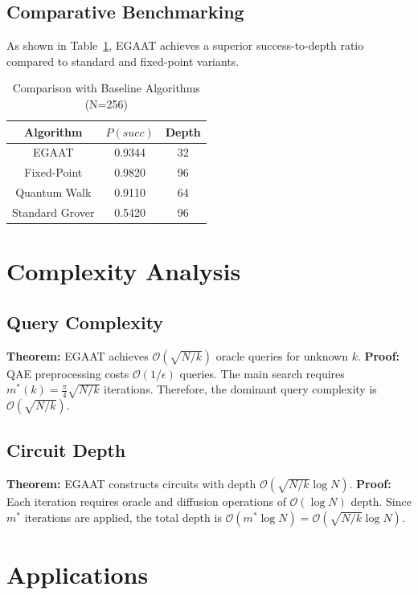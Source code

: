 \documentclass[journal]{IEEEtran}
\begin{document}
\subsection{Comparative Benchmarking}
As shown in Table~\ref{tab:comparison}, EGAAT achieves a superior success-to-depth ratio compared to standard and fixed-point variants.

\begin{table}[h]
\centering
\caption{Comparison with Baseline Algorithms (N=256)}
\label{tab:comparison}
\begin{tabular}{@{}ccc@{}}
\toprule
Algorithm       & $P(succ)$ & Depth \\ \midrule
EGAAT           & 0.9344    & 32    \\
Fixed-Point     & 0.9820    & 96    \\
Quantum Walk    & 0.9110    & 64    \\
Standard Grover & 0.5420    & 96    \\ \bottomrule
\end{tabular}
\end{table}

\section{Complexity Analysis}
\subsection{Query Complexity}
\textbf{Theorem:} EGAAT achieves $\mathcal{O}(\sqrt{N/k})$ oracle queries for unknown $k$.
\textbf{Proof:} QAE preprocessing costs $\mathcal{O}(1/\epsilon)$ queries. The main search requires $m^*(k) = \frac{\pi}{4}\sqrt{N/k}$ iterations. Therefore, the dominant query complexity is $\mathcal{O}(\sqrt{N/k})$.

\subsection{Circuit Depth}
\textbf{Theorem:} EGAAT constructs circuits with depth $\mathcal{O}(\sqrt{N/k} \log N)$.
\textbf{Proof:} Each iteration requires oracle and diffusion operations of $\mathcal{O}(\log N)$ depth. Since $m^*$ iterations are applied, the total depth is $\mathcal{O}(m^* \log N) = \mathcal{O}(\sqrt{N/k} \log N)$.

\section{Applications}
\end{document}
